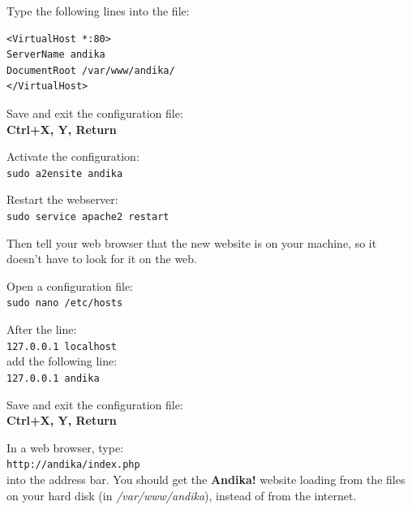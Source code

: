 Type the following lines into the file:\\
\vspace{-0.5cm}  %
\begin{verbatim}
<VirtualHost *:80>
ServerName andika
DocumentRoot /var/www/andika/
</VirtualHost>
\end{verbatim}

Save and exit the configuration file:\\
\textbf{Ctrl+X, Y, Return}

Activate the configuration:\\
\verb|sudo a2ensite andika|

Restart the webserver:\\
\verb|sudo service apache2 restart|

Then tell your web browser that the new website is on your machine, so it doesn't have to look for it on the web.

Open a configuration file:\\
\verb|sudo nano /etc/hosts|

After the line:\\
\verb|127.0.0.1	localhost|\\
add the following line:\\
\verb|127.0.0.1	andika|

Save and exit the configuration file:\\
\textbf{Ctrl+X, Y, Return}

In a web browser, type:\\
\verb|http://andika/index.php|\\
into the address bar.  You should get the \textbf{Andika!} website loading from the files on your hard disk (in \textit{/var/www/andika}), instead of from the internet.


